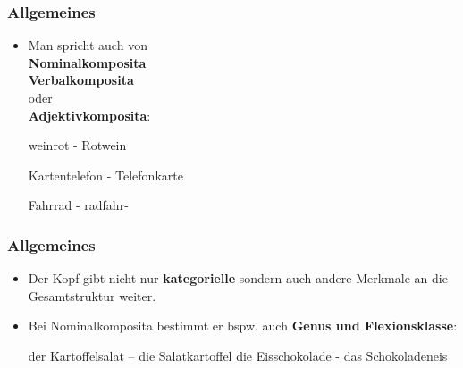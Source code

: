 \begin{frame}
\frametitle{Allgemeines}
\begin{minipage}{0.56\textwidth}
\begin{itemize}
	\item Man spricht auch von \\
	\textbf{Nominalkomposita} \\
	\textbf{Verbalkomposita} \\
	oder \\
	\textbf{Adjektivkomposita}:
	
	\ea weinrot - Rotwein
	\z
	
	\ea Kartentelefon - Telefonkarte
	\z

	\ea Fahrrad - radfahr-
	\z
		 
\end{itemize}
\end{minipage}\hfill%
\begin{minipage}{0.24\textwidth}

\begin{figure}
\centering
{}
\end{figure}
\begin{figure}
\centering
{}
\end{figure}

\end{minipage}\hfill%
\begin{minipage}{0.18\textwidth}

\begin{figure}
\centering
{}
\end{figure}

\end{minipage}

\end{frame}


\begin{frame}
\frametitle{Allgemeines}

\begin{itemize}
	\item Der Kopf gibt nicht nur \textbf{kategorielle} sondern auch andere Merkmale an die Gesamtstruktur weiter.
	\item Bei Nominalkomposita bestimmt er bspw. auch \textbf{Genus und Flexionsklasse}:
	
	\eal 
		\ex der Kartoffelsalat – die Salatkartoffel
		\ex die Eisschokolade - das Schokoladeneis
	\zl
		 
\end{itemize}


\end{frame}


